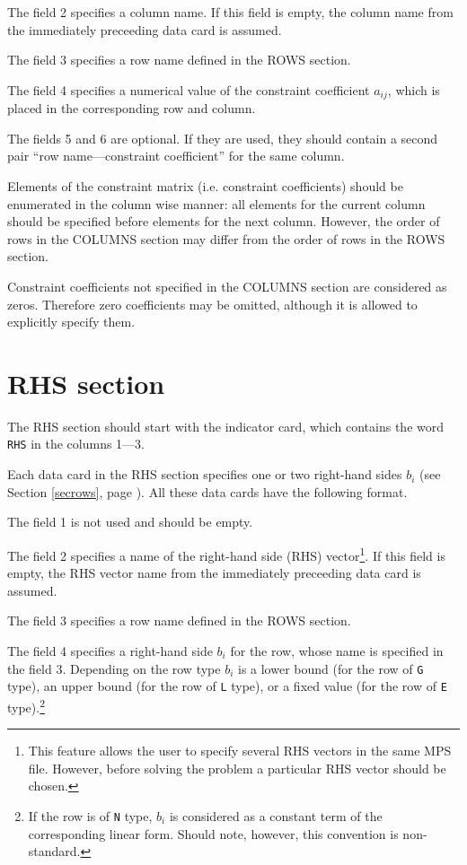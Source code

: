 The field 2 specifies a column name. If this field is empty, the column
name from the immediately preceeding data card is assumed.

The field 3 specifies a row name defined in the ROWS section.

The field 4 specifies a numerical value of the constraint coefficient
$a_{ij}$, which is placed in the corresponding row and column.

The fields 5 and 6 are optional. If they are used, they should contain
a second pair ``row name---constraint coefficient'' for the same column.

Elements of the constraint matrix (i.e. constraint coefficients) should
be enumerated in the column wise manner: all elements for the current
column should be specified before elements for the next column. However,
the order of rows in the COLUMNS section may differ from the order of
rows in the ROWS section.

Constraint coefficients not specified in the COLUMNS section are
considered as zeros. Therefore zero coefficients may be omitted,
although it is allowed to explicitly specify them.

\section{RHS section}

The RHS section should start with the indicator card, which contains the
word \verb|RHS| in the columns 1---3.

Each data card in the RHS section specifies one or two right-hand sides
$b_i$ (see Section \ref{secrows}, page \pageref{secrows}). All these
data cards have the following format.

The field 1 is not used and should be empty.

The field 2 specifies a name of the right-hand side (RHS)
vector\footnote{This feature allows the user to specify several RHS
vectors in the same MPS file. However, before solving the problem a
particular RHS vector should be chosen.}. If this field is empty, the
RHS vector name from the immediately preceeding data card is assumed.


The field 3 specifies a row name defined in the ROWS section.

The field 4 specifies a right-hand side $b_i$ for the row, whose name is
specified in the field 3. Depending on the row type $b_i$ is a lower
bound (for the row of \verb|G| type), an upper bound (for the row of
\verb|L| type), or a fixed value (for the row of \verb|E|
type).\footnote{If the row is of {\tt N} type, $b_i$ is considered as
a constant term of the corresponding linear form. Should note, however,
this convention is non-standard.}

